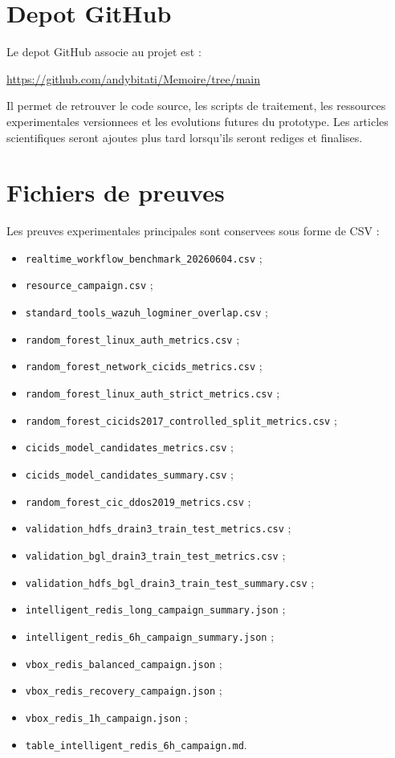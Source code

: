 \section{Depot GitHub}
Le depot GitHub associe au projet est :

\begin{center}
\url{https://github.com/andybitati/Memoire/tree/main}
\end{center}

Il permet de retrouver le code source, les scripts de traitement, les ressources experimentales versionnees et les evolutions futures du prototype. Les articles scientifiques seront ajoutes plus tard lorsqu'ils seront rediges et finalises.

\section{Fichiers de preuves}
Les preuves experimentales principales sont conservees sous forme de CSV :
\begin{itemize}
  \item \texttt{realtime\_workflow\_benchmark\_20260604.csv} ;
  \item \texttt{resource\_campaign.csv} ;
  \item \texttt{standard\_tools\_wazuh\_logminer\_overlap.csv} ;
  \item \texttt{random\_forest\_linux\_auth\_metrics.csv} ;
  \item \texttt{random\_forest\_network\_cicids\_metrics.csv} ;
  \item \texttt{random\_forest\_linux\_auth\_strict\_metrics.csv} ;
  \item \texttt{random\_forest\_cicids2017\_controlled\_split\_metrics.csv} ;
  \item \texttt{cicids\_model\_candidates\_metrics.csv} ;
  \item \texttt{cicids\_model\_candidates\_summary.csv} ;
  \item \texttt{random\_forest\_cic\_ddos2019\_metrics.csv} ;
  \item \texttt{validation\_hdfs\_drain3\_train\_test\_metrics.csv} ;
  \item \texttt{validation\_bgl\_drain3\_train\_test\_metrics.csv} ;
  \item \texttt{validation\_hdfs\_bgl\_drain3\_train\_test\_summary.csv} ;
  \item \texttt{intelligent\_redis\_long\_campaign\_summary.json} ;
  \item \texttt{intelligent\_redis\_6h\_campaign\_summary.json} ;
  \item \texttt{vbox\_redis\_balanced\_campaign.json} ;
  \item \texttt{vbox\_redis\_recovery\_campaign.json} ;
  \item \texttt{vbox\_redis\_1h\_campaign.json} ;
  \item \texttt{table\_intelligent\_redis\_6h\_campaign.md}.
\end{itemize}

